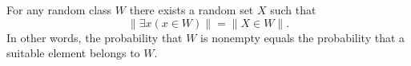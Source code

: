 For any random class $W$ there exists a random set $X$ such that
$$\|\exists x (x \in W)\| = \|X \in W\|.$$
In other words, the probability that $W$ is nonempty equals the probability that a suitable element belongs to $W$.